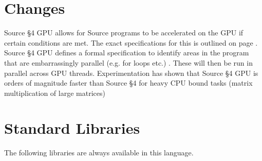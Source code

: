 





\section{Changes}

Source \S 4 GPU allows for Source programs to be accelerated on the GPU if certain conditions are met.
The exact specifications for this is outlined on page \pageref{gpu_supp}. Source \S 4 GPU  defines a formal specification 
to identify areas in the program that are embarrassingly parallel (e.g. for loops etc.) . These will then
be run in parallel across GPU threads. Experimentation has shown that Source \S 4 GPU is orders of magnitude faster
than Source \S 4 for heavy CPU bound tasks (matrix multiplication of large matrices)





\newpage





















\section{Standard Libraries}

The following libraries are always available in this language.











